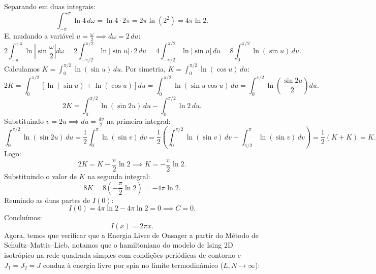 \documentclass[11pt,a4paper]{article}
\begin{document}
%
Separando em duas integrais:
%
\begin{equation}
        \int_{-\pi}^{+\pi} \ln 4 \, d\omega = \ln 4 \cdot 2\pi = 2\pi \ln(2^2) = 4\pi \ln 2.
\end{equation}
%
E, mudando a variável $u = \frac{\omega}{2} \implies d\omega = 2\,du$:
%
\begin{equation}
        2 \int_{-\pi}^{+\pi} \ln\left|\sin\frac{\omega}{2}\right| d\omega 
        = 2 \int_{-\pi/2}^{\pi/2} \ln|\sin u| \cdot 2\,du 
        = 4 \int_{-\pi/2}^{\pi/2} \ln|\sin u| \, du 
        = 8 \int_0^{\pi/2} \ln(\sin u) \, du.
\end{equation}
%
Calculamos $K = \int_0^{\pi/2} \ln(\sin u) \, du$. Por simetria, $K = \int_0^{\pi/2} \ln(\cos u) \, du$:
%
\begin{equation}
    2K = \int_0^{\pi/2} \left[ \ln(\sin u) + \ln(\cos u) \right] du 
    = \int_0^{\pi/2} \ln(\sin u \cos u) \, du 
    = \int_0^{\pi/2} \ln\left(\frac{\sin 2u}{2}\right) du.
\end{equation}
%
\begin{equation}
    2K = \int_0^{\pi/2} \ln(\sin 2u) \, du - \int_0^{\pi/2} \ln 2 \, du.
\end{equation}
%
Substituindo $v = 2u \implies du = \frac{dv}{2}$ na primeira integral:
%
\begin{equation}
    \int_0^{\pi/2} \ln(\sin 2u) \, du 
    = \frac{1}{2} \int_0^{\pi} \ln(\sin v) \, dv 
    = \frac{1}{2} \left( \int_0^{\pi/2} \ln(\sin v) \, dv + \int_{\pi/2}^{\pi} \ln(\sin v) \, dv \right) 
    = \frac{1}{2}(K + K) = K.
\end{equation}
%
Logo:
%
\begin{equation}
    2K = K - \frac{\pi}{2} \ln 2 \implies K = -\frac{\pi}{2} \ln 2.
\end{equation}
%
Substituindo o valor de $K$ na segunda integral:
%
\begin{equation}
    8 K = 8 \left(-\frac{\pi}{2} \ln 2\right) = -4\pi \ln 2.
\end{equation}
%
Reunindo as duas partes de $I(0)$:
%
\begin{equation}
    I(0) = 4\pi \ln 2 - 4\pi \ln 2 = 0 \implies C = 0.
\end{equation}
%
Concluímos:
%
\begin{equation}
    \boxed{I(x) = 2\pi x.}
\end{equation}
%
\newpage
%
Agora, temos que verificar que a Energia Livre de Onsager a partir do Método de Schultz--Mattis--Lieb, notamos que o hamiltoniano do modelo de Ising 2D isotrópico na rede quadrada simples com condições periódicas de contorno e $J_1=J_2=J$ conduz à energia livre por spin no limite termodinâmico ($L, N \to \infty$):
\end{document}
